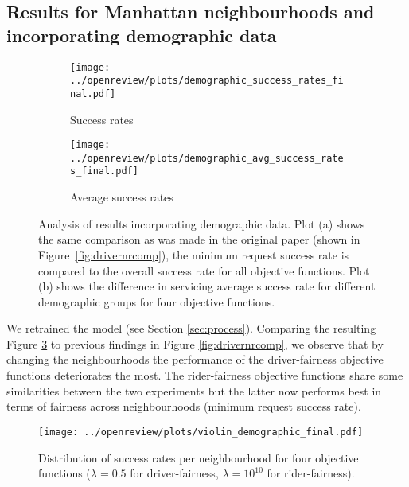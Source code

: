 \subsection{Results for Manhattan neighbourhoods and incorporating demographic data}
\begin{figure}[ht]
    \centering
    \begin{subfigure}{0.5\textwidth}
      \centering
      \texttt{[image: ../openreview/plots/demographic\_success\_rates\_final.pdf]}
      \caption{Success rates}
      \label{fig:demographic_1_success_rates}
    \end{subfigure}%
    \begin{subfigure}{0.5\textwidth}
      \centering
      \texttt{[image: ../openreview/plots/demographic\_avg\_success\_rates\_final.pdf]}
      \caption{Average success rates}
      \label{fig:demographic_1_avg_success_rates}
    \end{subfigure}
    \caption{Analysis of results incorporating demographic data. Plot (a) shows the same comparison as was made in the original paper (shown in Figure~\ref{fig:drivernrcomp}), the minimum request success rate is compared to the overall success rate for all objective functions. Plot (b) shows the difference in servicing average success rate for different demographic groups for four objective functions. }
    \label{fig:demographic_1}
\end{figure}



We retrained the model (see Section \ref{sec:process}). Comparing the resulting Figure \ref{fig:demographic_1} to previous findings in Figure \ref{fig:drivernrcomp}, we observe that by changing the neighbourhoods the performance of the driver-fairness objective functions deteriorates the most. The rider-fairness objective functions share some similarities between the two experiments but the latter now performs best in terms of fairness across neighbourhoods (minimum request success rate). 

\begin{wrapfigure}{r}{0.65\textwidth}
    \centering
    \texttt{[image: ../openreview/plots/violin\_demographic\_final.pdf]}
    \caption{Distribution of success rates per neighbourhood for four objective functions ($\lambda=0.5$ for driver-fairness, $\lambda=10^{10}$ for rider-fairness).  }
    \label{fig:violin_demographic}
\end{wrapfigure}



